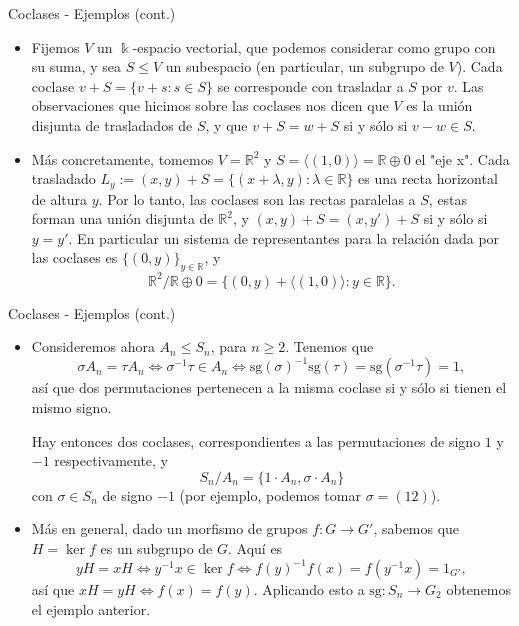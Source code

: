 \documentclass{beamer}
\def\R{\mathbb{R}}
\def\sg{\mathrm{sg}}
\begin{document}
\begin{frame}{Coclases - Ejemplos (cont.)}
  \begin{itemize}
  \item Fijemos $V$ un $\Bbbk$-espacio vectorial, que podemos considerar como grupo con su suma, y sea $S \leq V$ un subespacio (en particular, un subgrupo de $V$). Cada coclase $v + S = \{v+s : s \in S\}$ se corresponde con trasladar a $S$ por $v$.  Las observaciones que hicimos sobre las coclases nos dicen que $V$ es la unión disjunta de trasladados de $S$, y que $v + S = w+S$ si y sólo si $v-w \in S$.
  \medskip
  \item Más concretamente, tomemos $V = \R^2$ y $S = \langle (1,0)\rangle = \R \oplus 0$ el "eje x".  Cada trasladado $L_y := (x,y) + S = \{(x+\lambda,y) : \lambda \in \R\}$ es una recta horizontal de altura $y$.  Por lo tanto, las coclases son las rectas paralelas a $S$, estas forman una unión disjunta de $\R^2$, y $(x,y)+S = (x,y')+S$ si y sólo si $y = y'$.  En particular un sistema de representantes para la relación dada por las coclases es $\{(0,y)\}_{y \in \R}$, y
  \[
  \R^2/\R \oplus 0 = \{(0,y) + \langle (1,0)\rangle : y \in \R\}.
  \]
  \end{itemize}
\end{frame}

\begin{frame}{Coclases - Ejemplos (cont.)}
  \medskip
  \begin{itemize}
  \item Consideremos ahora $A_n \leq S_n$, para $n \geq 2$. Tenemos que
    \[
    \sigma A_n = \tau A_n \iff \sigma^{-1}\tau \in A_n \iff \sg(\sigma)^{-1}\sg(\tau) = \sg(\sigma^{-1}\tau) = 1,
    \]
    así que dos permutaciones pertenecen a la misma coclase si y sólo si tienen el mismo signo.
    
    Hay entonces dos coclases, correspondientes a las permutaciones de signo $1$ y $-1$ respectivamente, y 
    \[
    S_n/A_n = \{1 \cdot A_n, \sigma \cdot A_n \}
    \]
    con $\sigma \in S_n$ de signo $-1$ (por ejemplo, podemos tomar $\sigma = (12)$).
  \item Más en general, dado un morfismo de grupos $f : G \to G'$, sabemos que $H = \ker f$ es un subgrupo de $G$. Aquí es
  \[
  yH = xH \iff y^{-1}x \in \ker f \iff f(y)^{-1}f(x) = f(y^{-1}x) = 1_{G'},
  \]
  así que $xH = yH \iff f(x) = f(y)$. Aplicando esto a $\sg : S_n \to G_2$ obtenemos el ejemplo anterior.
  \end{itemize}
\end{frame}
\end{document}

